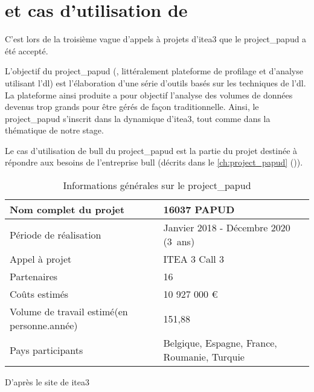 \pagebreak
\section{ et cas d'utilisation de }
C'est lors de la troisième vague d'appels à projets d'\gls{itea3} que le  \gls{project_papud} a été accepté.

L'objectif du \gls{project_papud} (, littéralement \og plateforme de profilage et d'analyse utilisant l'\gls{dl}\fg{}) est l'élaboration d'une série d'outils basés sur les techniques de l'\gls{dl}.
La plateforme ainsi produite a pour objectif l'analyse des volumes de données devenus trop grands pour être gérés de façon traditionnelle.
Ainsi, le \gls{project_papud} s'inscrit dans la dynamique d'\gls{itea3}, tout comme dans la thématique de notre stage.

Le cas d'utilisation de \gls{bull} du \gls{project_papud} est la partie du projet destinée à répondre aux besoins de l'entreprise \gls{bull} (décrits dans le \autoref{ch:project_papud} ()).

\begin{table}[h]{
	\centering
	\renewcommand{\arraystretch}{1.5}
	\setlength\tabcolsep{1em}
	\begin{tabularx}{\textwidth}{|X|l|}
		\hline
		Nom complet du projet & 16037 PAPUD\\
		\hline
		Période de réalisation & Janvier 2018 - Décembre 2020 (3~ans)\\
		\hline
		Appel à projet & ITEA 3 Call 3\\
		\hline
		Partenaires & 16\\
		\hline
		Coûts estimés & 10 927 000 €\\
		\hline
		Volume de travail estimé\newline (en personne.année) & 151,88 \\
		\hline
		Pays participants & Belgique, Espagne, France, \mbox{Roumanie}, Turquie\\
		\hline
	\end{tabularx}
	\renewcommand{\arraystretch}{1}}

	{\footnotesize D'après le site de \gls{itea3} \autocite{about_papud}} \label{tab:about_papud}
	\caption[Informations générales sur le ]{Informations générales sur le \gls{project_papud}}
\end{table}

